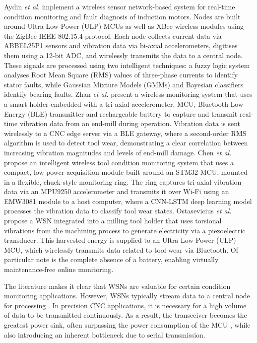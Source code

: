 \documentclass[../main.tex]{subfiles}
\begin{document}
Aydin \textit{et al.} \cite{RN31} implement a wireless sensor network-based system for real-time condition monitoring and fault diagnosis of induction motors. Nodes are built around Ultra Low-Power (ULP) MCUs as well as XBee wireless modules using the ZigBee IEEE 802.15.4 protocol. Each node collects current data via ABBEL25P1 sensors and vibration data via bi-axial accelerometers, digitises them using a 12-bit ADC, and wirelessly transmits the data to a central node. These signals are processed using two intelligent techniques: a fuzzy logic system analyses Root Mean Square (RMS) values of three-phase currents to identify stator faults, while Gaussian Mixture Models (GMMs) and Bayesian classifiers identify bearing faults. Zhan \textit{et al.} \cite{RN32} present a wireless monitoring system that uses a smart holder embedded with a tri-axial accelerometer, MCU, Bluetooth Low Energy (BLE) transmitter and rechargeable battery to capture and transmit real-time vibration data from an end-mill during operation. Vibration data is sent wirelessly to a CNC edge server via a BLE gateway, where a second-order RMS algorithm is used to detect tool wear, demonstrating a clear correlation between increasing vibration magnitudes and levels of end-mill damage. Chen \textit{et al.} \cite{RN33} propose an intelligent wireless tool condition monitoring system that uses a compact, low-power acquisition module built around an STM32 MCU, mounted in a flexible, chuck-style monitoring ring. The ring captures tri-axial vibration data via an MPU9250 accelerometer and transmits it over Wi-Fi using an EMW3081 module to a host computer, where a CNN-LSTM deep learning model processes the vibration data to classify tool wear states. Ostasevicius \textit{et al.} \cite{RN28, RN30} propose a WSN integrated into a milling tool holder that uses torsional vibrations from the machining process to generate electricity via a piezoelectric transducer. This harvested energy is supplied to an Ultra Low-Power (ULP) MCU, which wirelessly transmits data related to tool wear via Bluetooth. Of particular note is the complete absence of a battery, enabling virtually maintenance-free online monitoring.

The literature makes it clear that WSNs are valuable for certain condition monitoring applications. However, WSNs typically stream data to a central node for processing \cite{RN35}. In precision CNC applications, it is necessary for a high volume of data to be transmitted continuously. As a result, the transceiver becomes the greatest power sink, often surpassing the power consumption of the MCU \cite{RN36}, while also introducing an inherent bottleneck due to serial transmission. 
\end{document}
